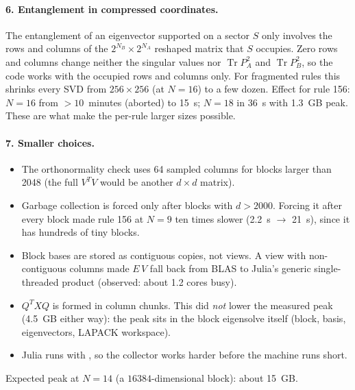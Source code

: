\paragraph{6. Entanglement in compressed coordinates.} The entanglement of an eigenvector supported on a sector $S$ only
involves the rows and columns of the $2^{N_B}\times2^{N_A}$ reshaped matrix that $S$ occupies. Zero rows and columns
change neither the singular values nor $\operatorname{Tr}P_A^2$ and $\operatorname{Tr}P_B^2$, so the code works with the
occupied rows and columns only. For fragmented rules this shrinks every SVD from $256\times256$ (at $N=16$) to a few
dozen. Effect for rule 156: $N=16$ from $>10$~minutes (aborted) to 15~s; $N=18$ in 36~s with 1.3~GB peak. These are what
make the per-rule larger sizes possible.

\paragraph{7. Smaller choices.}
\begin{itemize}
\item The orthonormality check uses 64 sampled columns for blocks larger than 2048 (the full $V^TV$ would be another
  $d\times d$ matrix).
\item Garbage collection is forced only after blocks with $d>2000$. Forcing it after every block made rule 156 at $N=9$
  ten times slower (2.2~s $\to$ 21~s), since it has hundreds of tiny blocks.
\item Block bases are stored as contiguous copies, not views. A view with non-contiguous columns made $E\,V$ fall back
  from BLAS to Julia's generic single-threaded product (observed: about 1.2 cores busy).
\item $Q^TXQ$ is formed in column chunks. This did \emph{not} lower the measured peak (4.5~GB either way): the peak sits
  in the block eigensolve itself (block, basis, eigenvectors, LAPACK workspace).
\item Julia runs with , so the collector works harder before the machine runs short.
\end{itemize}
Expected peak at $N=14$ (a $16384$-dimensional block): about 15~GB.

